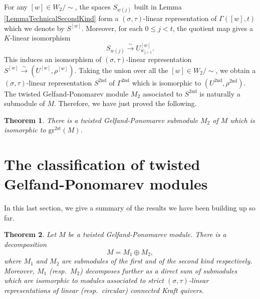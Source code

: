 \documentclass[12pt]{amsart}
\newtheorem{theorem}{Theorem}[section]
\theoremstyle{definition}
\newcommand{\<}{\langle}   %
\renewcommand{\>}{\rangle} %
\begin{document}
For any $[w] \in W_2/\sim$, the spaces $S_{w(j)}$ built in Lemma \ref{LemmaTechnicalSecondKind} form a $(\sigma,\tau)$-linear representation of $\Gamma([w],t)$ which we denote by $S^{[w]}$. Moreover, for each $0 \leq j < t$, the quotient map gives a $K$-linear isomorphism 
\begin{equation*}
    S_{w(j)} \xrightarrow{\sim} U^{[w]}_{w_{j+1}}.
\end{equation*}
This induces an isomorphism of $(\sigma,\tau)$-linear representation $S^{[w]} \xrightarrow{\sim} (U^{[w]},\rho^{[w]})$. Taking the union over all the $[w] \in W_2/\sim$, we obtain a $(\sigma,\tau)$-linear representation $S^{2\mathrm{nd}}$ of $\Gamma^{2\mathrm{nd}}$ which is isomorphic to $(U^{2\mathrm{nd}},\rho^{2\mathrm{nd}})$. The twisted Gelfand-Ponomarev module $M_2$ associated to $S^{2\mathrm{nd}}$ is naturally a submodule of $M$. Therefore, we have just proved the following. 

\begin{theorem}\label{TheoremExistenceM2}
    There is a twisted Gelfand-Ponomarev submodule $M_2$ of $M$ which is isomorphic to $\mathrm{gr}^{2\mathrm{st}}(M)$. 
\end{theorem}

\section{The classification of twisted Gelfand-Ponomarev modules} \label{Section4}

In this last section, we give a summary of the results we have been building up so far.

\begin{theorem}\label{TheoremDecompositionIntoM1M2}
    Let $M$ be a twisted Gelfand-Ponomarev module. There is a decomposition 
    \begin{equation*}
        M = M_1 \oplus M_2,
    \end{equation*}
    where $M_1$ and $M_2$ are submodules of the first and of the second kind respectively. Moreover, $M_1$ (resp.~$M_2$) decomposes further as a direct sum of submodules which are isomorphic to modules associated to strict $(\sigma,\tau)$-linear representations of linear (resp.~circular) connected Kraft quivers. 
\end{theorem}
\end{document}
